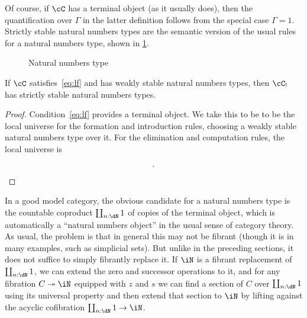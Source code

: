 \documentclass{amsart}
\let\N\iN
\let\C\cC
\def\zero{\mathsf{zero}}
\def\succ{\mathsf{succ}}
\def\nrec{\mathsf{nrec}}
\let\type\fibtype
\begin{document}
Of course, if $\C$ has a terminal object (as it usually does), then the quantification over $\Gamma$ in the latter definition follows from the special case $\Gamma=1$.
Strictly stable natural numbers types are the semantic version of the usual rules for a natural numbers type, shown in \cref{fig:nno}.

\begin{figure}
  \centering
  \caption{Natural numbers type}
  \label{fig:nno}
\end{figure}

\begin{thm}
  If $\C$ satisfies~\eqref{eq:lf} and has weakly stable natural numbers types, then $\C_!$ has strictly stable natural numbers types.
\end{thm}
\begin{proof}
  Condition~\eqref{eq:lf} provides a terminal object.
  We take this to be to be the local universe for the formation and introduction rules, choosing a weakly stable natural numbers type over it.
  For the elimination and computation rules, the local universe is
  \begin{align*}
    [&c: \prod x:E_{\N}. V_C,\\
    &z: E_C(c(\zero)),\\
    &s: \prod x:E_{\N}, y:E_C(c(x)) . E_C(c(\succ(x))) ].\qedhere
  \end{align*}
\end{proof}

In a good model category, the obvious candidate for a natural numbers type is the countable coproduct $\coprod_{n:\dN} 1$ of copies of the terminal object, which is automatically a ``natural numbers object'' in the usual sense of category theory.
As usual, the problem is that in general this may not be fibrant (though it is in many examples, such as simplicial sets).
But unlike in the preceding sections, it does not suffice to simply fibrantly replace it.
If $\N$ is a fibrant replacement of $\coprod_{n:\dN} 1$, we can extend the zero and successor operations to it, and for any fibration $C\fib\N$ equipped with $z$ and $s$ we can find a section of $C$ over $\coprod_{n:\dN} 1$ using its universal property and then extend that section to $\N$ by lifting against the acyclic cofibration $\coprod_{n:\dN} 1 \to \N$.
\end{document}
